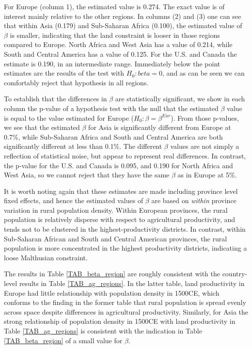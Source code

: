 \documentclass[11pt]{article}
\begin{document}
For Europe (column 1), the estimated value is 0.274. The exact value is of interest mainly relative to the other regions. In columns (2) and (3) one can see that within Asia (0.179) and Sub-Saharan Africa (0.100), the estimated value of $\beta$ is smaller, indicating that the land constraint is looser in those regions compared to Europe. North Africa and West Asia has a value of 0.214, while South and Central America has a value of 0.125. For the U.S. and Canada the estimate is 0.190, in an intermediate range. Immediately below the point estimates are the results of the test with $H_0: beta = 0$, and as can be seen we can comfortably reject that hypothesis in all regions.

To establish that the differences in $\beta$ are statistically significant, we show in each column the p-value of a hypothesis test with the null that the estimated $\beta$ value is equal to the value estimated for Europe ($H_0: \beta = \beta^{Eur}$). From those p-values, we see that the estimated $\beta$ for Asia is significantly different from Europe at 0.7\%, while Sub-Saharan Africa and South and Central America are both significantly different at less than 0.1\%. The different $\beta$ values are not simply a reflection of statistical noise, but appear to represent real differences. In contrast, the p-value for the U.S. and Canada is 0.095, and 0.190 for North Africa and West Asia, so we cannot reject that they have the same $\beta$ as in Europe at 5\%.

It is worth noting again that these estimates are made including province level fixed effects, and hence the estimated values of $\beta$ are based on \textit{within} province variation in rural population density. Within European provinces, the rural population is relatively disperse with respect to agricultural productivity, and tends not to be clustered in the highest-productivity districts. In contrast, within Sub-Saharan African and South and Central American provinces, the rural population is more concentrated in the highest productivity districts, indicating a loose Malthusian constraint.

The results in Table \ref{TAB_beta_region} are roughly consistent with the country-level results in Table \ref{TAB_ag_regions}. In the latter table, land productivity in Europe had little relationship with population density in 1500CE, which conforms to the finding in the former table that rural population is spread evenly across space despite differences in agricultural productivity. Similarly, for Asia the strong relationship of population density in 1500CE with land productivity in Table \ref{TAB_ag_regions} is consistent with the indication in Table \ref{TAB_beta_region} of a small value for $\beta$.
\end{document}
